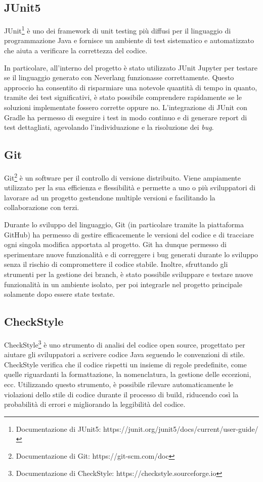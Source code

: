\documentclass[12pt,a4paper,openright,twoside]{book}
\begin{document}
\subsection{JUnit5}
JUnit\footnote{Documentazione di JUnit5: https://junit.org/junit5/docs/current/user-guide/} è uno dei framework di unit testing più diffusi 
per il linguaggio di programmazione Java e fornisce un ambiente di test sistematico e automatizzato che aiuta a verificare la correttezza del 
codice.

In particolare, all’interno del progetto è stato utilizzato JUnit Jupyter per testare se il linguaggio generato con Neverlang funzionasse 
correttamente. Questo approccio ha consentito di risparmiare una notevole quantità di tempo in quanto, tramite dei test significativi, è stato 
possibile comprendere rapidamente se le soluzioni implementate fossero corrette oppure no. L’integrazione di JUnit con Gradle ha permesso di 
eseguire i test in modo continuo e di generare report di test dettagliati, agevolando l’individuazione e la risoluzione dei \textit{bug}.

\subsection{Git}
Git\footnote{Documentazione di Git: https://git-scm.com/doc} è un software per il controllo di versione distribuito. Viene ampiamente 
utilizzato per la sua efficienza e flessibilità e permette a uno o più sviluppatori di lavorare ad un progetto gestendone multiple versioni e 
facilitando la collaborazione con terzi.

Durante lo sviluppo del linguaggio, Git (in particolare tramite la piattaforma GitHub) ha permesso di gestire efficacemente le versioni del 
codice e di tracciare ogni singola modifica apportata al progetto. Git ha dunque permesso di sperimentare nuove funzionalità e di correggere 
i bug generati durante lo sviluppo senza il rischio di compromettere il codice stabile. Inoltre, sfruttando gli strumenti per la gestione dei 
branch, è stato possibile sviluppare e testare nuove funzionalità in un ambiente isolato, per poi integrarle nel progetto principale solamente 
dopo essere state testate.

\subsection{CheckStyle}
CheckStyle\footnote{Documentazione di CheckStyle: https://checkstyle.sourceforge.io} è uno strumento di analisi del codice open source, 
progettato per aiutare gli sviluppatori a scrivere codice Java seguendo le convenzioni di stile. CheckStyle verifica che il codice rispetti 
un insieme di regole predefinite, come quelle riguardanti la formattazione, la nomenclatura, la gestione delle eccezioni, ecc. Utilizzando 
questo strumento, è possibile rilevare automaticamente le violazioni dello stile di codice durante il processo di build, riducendo così la 
probabilità di errori e migliorando la leggibilità del codice.
\end{document}
